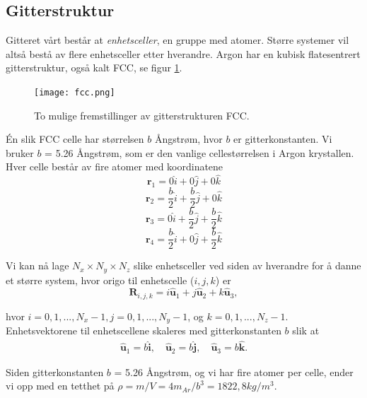 \documentclass[paper=a4, fontsize=11pt]{scrartcl} %
\numberwithin{equation}{section} %
\numberwithin{figure}{section} %
\numberwithin{table}{section} %
\begin{document}
\subsection{Gitterstruktur}
Gitteret vårt består at \textit{enhetsceller}, en gruppe med atomer. Større systemer vil altså bestå av flere enhetsceller etter hverandre. Argon har en kubisk flatesentrert gitterstruktur, også kalt FCC, se figur \ref{fcc}. 

\FloatBarrier
\begin{figure}[!ht]
 \centering
 \texttt{[image: fcc.png]}
 \caption{To mulige fremstillinger av gitterstrukturen FCC.}
 \label{fcc}
 \end{figure}
 \FloatBarrier

Én slik FCC celle har størrelsen $b$ Ångstrøm, hvor $b$ er gitterkonstanten. Vi bruker $b$ = 5.26 Ångstrøm, som er den vanlige cellestørrelsen i Argon krystallen. Hver celle består av fire atomer med koordinatene
\begin{equation}
\textbf{r}_1 = 0 \hat{i} + 0 \hat{j} + 0 \hat{k}
\end{equation}
\begin{equation}
\textbf{r}_2 = \frac{b}{2} \hat{i} + \frac{b}{2} \hat{j} + 0 \hat{k}
\end{equation}
\begin{equation}
\textbf{r}_3 = 0 \hat{i} + \frac{b}{2} \hat{j} + \frac{b}{2} \hat{k}
\end{equation}
\begin{equation}
\textbf{r}_4 = \frac{b}{2} \hat{i} + 0 \hat{j} + \frac{b}{2} \hat{k}
\end{equation}

Vi kan nå lage $N_x \times N_y \times N_z$ slike enhetsceller ved siden av hverandre for å danne et større system, hvor origo til enhetscelle ($i,j,k$) er 
\begin{equation}
\mathbf{R}_{i,j,k} = i \hat{\mathbf{u}}_1 + j \hat{\mathbf{u}}_2 + k \hat{\mathbf{u}}_3,
\end{equation}

hvor $i=0,1,..., N_x-1, j=0,1,..., N_y-1$, og $k=0,1,..., N_z-1$. Enhetsvektorene til enhetscellene skaleres med gitterkonstanten $b$ slik at
\begin{align}
	\hat{\mathbf{u}}_1 = b\hat{\mathbf{i}}, \quad \hat{\mathbf{u}}_2 = b\hat{\mathbf{j}}, \quad \hat{\mathbf{u}}_3 = b\hat{\mathbf{k}}.
\end{align}

Siden gitterkonstanten $b$ = 5.26 Ångstrøm, og vi har fire atomer per celle, ender vi opp med en tetthet på $\rho = m/V = 4m_{Ar}/b^3 = 1822,8 kg/m^3$.
\end{document}
